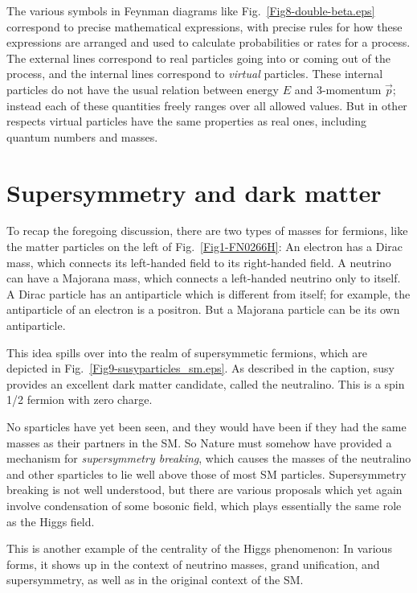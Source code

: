 \documentclass[12pt]{iopart}
\begin{document}
The various symbols in Feynman diagrams like Fig.~\ref{Fig8-double-beta.eps} correspond to precise mathematical expressions, with precise rules for how these expressions are arranged and used to calculate probabilities or rates for a process. The external lines correspond to real particles going into or coming out of the process, and the internal lines correspond to \textit{virtual} particles. These internal particles do not have the usual relation between energy $E$ and 3-momentum $\vec{p}$; instead each of these quantities freely ranges over all allowed values. But in other respects virtual particles have the same properties as real ones, including quantum numbers and masses. 

\section{\label{sec:sec4} Supersymmetry and dark matter}

To recap the foregoing discussion, there are two types of masses for fermions, like the matter particles on the left of Fig.~\ref{Fig1-FN0266H}: An electron has a Dirac mass, which connects its left-handed field to its right-handed field. A neutrino can have a Majorana mass, which connects a left-handed neutrino only to itself. A Dirac particle has an antiparticle which is different from itself; for example, the antiparticle of an electron is a positron. But a Majorana particle can be its own antiparticle.  

This idea spills over into the realm of supersymmetic fermions, which are depicted in Fig.~\ref{Fig9-susyparticles_sm.eps}. As described in the caption, susy provides an excellent dark matter candidate, called the neutralino. This is a spin 1/2 fermion with zero  charge. 

No sparticles have yet been seen, and they would have been if they had the same masses as their partners in the SM. So Nature must somehow have provided a mechanism for \textit{supersymmetry breaking}, which causes the masses of the neutralino and other sparticles to lie well above those of most SM particles. Supersymmetry breaking is not well understood, but there are various proposals which yet again involve condensation of some bosonic field, which plays essentially the same role as the Higgs field.

This is another example of the centrality of the Higgs phenomenon: In various forms, it shows up in the context of neutrino masses, grand unification, and supersymmetry, as well as in the original context of the SM.
\end{document}
